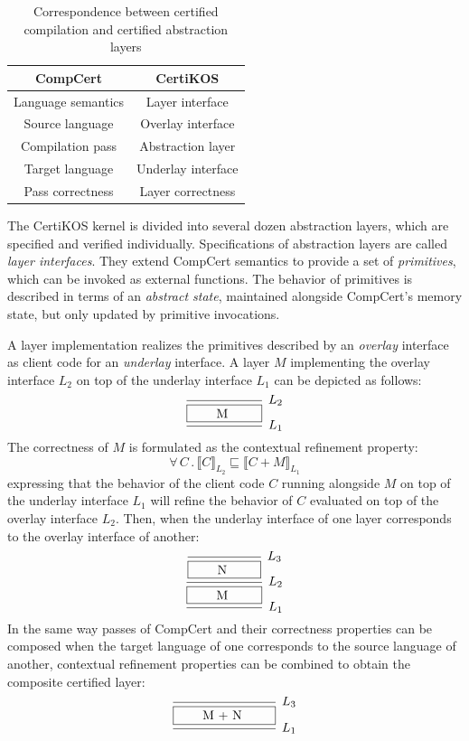 \documentclass[11pt,oneside,draft]{book}
\theoremstyle{definition}
\newcommand{\refby}{\sqsubseteq} %
\begin{document}
\begin{table}
  \centering
  \begin{tabular}{c@{\qquad}c}
    \hline
    CompCert & CertiKOS \\
    \hline
    Language semantics & Layer interface \\
    Source language & Overlay interface \\
    Compilation pass & Abstraction layer \\
    Target language & Underlay interface \\
    Pass correctness & Layer correctness \\
    \hline
  \end{tabular}
  \caption{
    Correspondence between certified compilation
    and certified abstraction layers
  }
  \label{tbl:compccal}
\end{table}

The CertiKOS kernel is divided into several dozen abstraction layers,
which are specified and verified individually.
Specifications of abstraction layers
are called \emph{layer interfaces}.
They extend CompCert semantics
to provide a set of \emph{primitives},
which can be invoked as
external functions.
The behavior of primitives is described in terms of
an \emph{abstract state},
maintained alongside CompCert's memory state,
but only updated by primitive invocations.

A layer implementation
realizes the primitives described by an \emph{overlay} interface
as client code for an \emph{underlay} interface.
A layer $M$ implementing the overlay interface $L_2$
on top of the underlay interface $L_1$ can be depicted as follows:
\[
  \begin{prooftree}
    \infer0[$L_2$]{\fbox{\qquad M \qquad}}
    \infer1[$L_1$]{}
  \end{prooftree}
\]
The correctness of $M$ is formulated as
the contextual refinement property:
\[
  \forall \, C \, . \,
  \llbracket C \rrbracket_{L_2} \refby
  \llbracket C + M \rrbracket_{L_1}
\]
expressing that the behavior of the client code $C$
running alongside $M$ on top of the underlay interface $L_1$
will refine the behavior of $C$
evaluated on top of the overlay interface $L_2$.
Then,
when the underlay interface of one layer
corresponds to the overlay interface of another:
\[
  \begin{prooftree}
    \infer0[$L_3$]{\fbox{\qquad N \qquad}}
    \infer1[$L_2$]{\fbox{\qquad M \qquad}}
    \infer1[$L_1$]{}
  \end{prooftree}
\]
In the same way passes of CompCert and their correctness properties
can be composed when the target language of one corresponds to
the source language of another,
contextual refinement properties can be combined
to obtain the composite certified layer:
\[
  \begin{prooftree}
    \infer0[$L_3$]{\fbox{\qquad M + N \qquad}}
    \infer1[$L_1$]{}
  \end{prooftree}
\]
\end{document}
